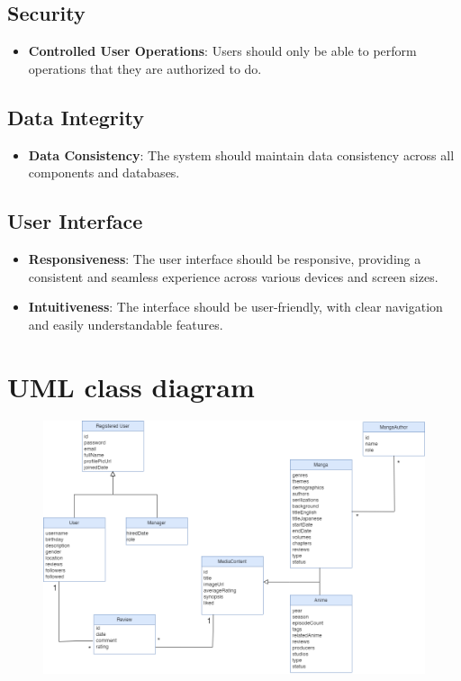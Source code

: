\subsection*{Security}

\begin{itemize}
    \item \textbf{Controlled User Operations}: Users should only be able to perform operations that they are authorized to do.
\end{itemize}

\subsection*{Data Integrity}

\begin{itemize}
    \item \textbf{Data Consistency}: The system should maintain data consistency across all components and databases.
\end{itemize}

\subsection*{User Interface}

\begin{itemize}
    \item \textbf{Responsiveness}: The user interface should be responsive, providing a consistent and seamless experience across various devices and screen sizes.
    
    \item \textbf{Intuitiveness}: The interface should be user-friendly, with clear navigation and easily understandable features.
\end{itemize}

\section{UML class diagram}

\begin{figure}[h]\label{uml class diagram}
    \centering
    \includegraphics[width=1\textwidth]{Media/Class Diagram.png}
\end{figure}

